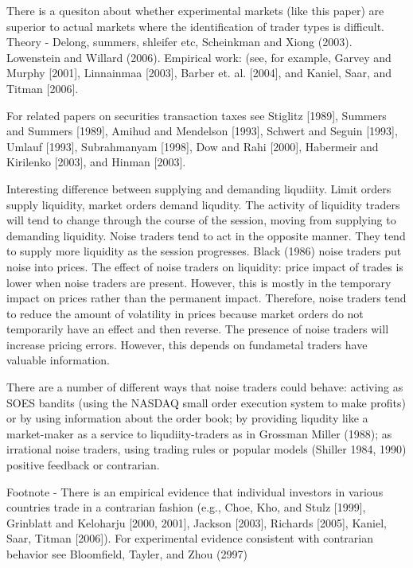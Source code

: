 \documentclass[12pt, a4paper, oneside]{article} %
\begin{document}
There is a quesiton about whether experimental markets (like this paper) are superior to actual markets where the identification of trader types is difficult.  Theory - Delong, summers, shleifer etc,  Scheinkman and Xiong (2003).  Lowenstein and Willard (2006).  Empirical work:  (see, for example, Garvey and Murphy [2001], Linnainmaa [2003], Barber et. al. [2004], and Kaniel, Saar, and Titman [2006].  

For related papers on securities transaction taxes see Stiglitz [1989], Summers and Summers [1989], 
Amihud and Mendelson [1993], Schwert and Seguin [1993], Umlauf [1993], Subrahmanyam [1998], Dow 
and Rahi [2000], Habermeir and Kirilenko [2003], and Hinman [2003]. 

Interesting difference between supplying and demanding liqudiity.  Limit orders supply liquidity, market orders demand liqudity.  The activity of liquidity traders will tend to change through the course of the session, moving from supplying to demanding liquidity. Noise traders tend to act in the opposite manner.  They tend to supply more liquidity as the session progresses. Black (1986) noise traders put noise into prices.  The effect of noise traders on liquidity: price impact of trades is lower when noise traders are present.  However, this is mostly in the temporary impact on prices rather than the permanent impact. Therefore, noise traders tend to reduce the amount of volatility in prices because market orders do not temporarily have an effect and then reverse.  The presence of noise traders will increase pricing errors. However, this depends on fundametal traders have valuable information. 

There are a number of different ways that noise traders could behave:  activing as SOES bandits (using the NASDAQ small order execution system to make profits) or by using information about the order book; by providing liqudity like a market-maker as a service to liqudiity-traders as in Grossman Miller (1988);  as irrational noise traders, using trading rules or popular models (Shiller 1984, 1990) positive feedback or contrarian.  

Footnote -  There is an empirical evidence that individual investors in various countries trade in a contrarian fashion (e.g., Choe, Kho, and Stulz [1999], Grinblatt and Keloharju [2000, 2001], Jackson [2003], Richards [2005], Kaniel, Saar, Titman [2006]). For experimental evidence consistent with contrarian behavior see 
Bloomfield, Tayler, and Zhou (2997)
\end{document}
